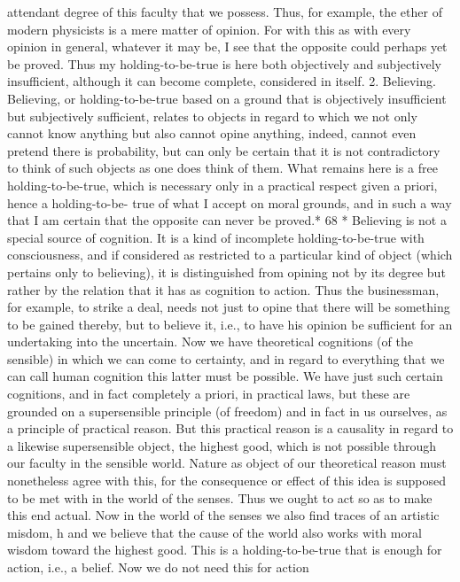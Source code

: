 attendant degree of this faculty that we possess. Thus, for example, the
ether of modern physicists is a mere matter of opinion. For with this as
with every opinion in general, whatever it may be, I see that the opposite
could perhaps yet be proved. Thus my holding-to-be-true is here both
objectively and subjectively insufficient, although it can become complete,
considered in itself.
2. Believing. Believing, or holding-to-be-true based on a ground that is
objectively insufficient but subjectively sufficient, relates to objects in
regard to which we not only cannot know anything but also cannot opine
anything, indeed, cannot even pretend there is probability, but can only be
certain that it is not contradictory to think of such objects as one does
think of them. What remains here is a free holding-to-be-true, which is
necessary only in a practical respect given a priori, hence a holding-to-be-
true of what I accept on moral grounds, and in such a way that I am certain
that the opposite can never be proved.*
68
* Believing is not a special source of cognition. It is a kind of incomplete holding-to-be-true
with consciousness, and if considered as restricted to a particular kind of object (which
pertains only to believing), it is distinguished from opining not by its degree but rather by the
relation that it has as cognition to action. Thus the businessman, for example, to strike a
deal, needs not just to opine that there will be something to be gained thereby, but to believe
it, i.e., to have his opinion be sufficient for an undertaking into the uncertain. Now we have
theoretical cognitions (of the sensible) in which we can come to certainty, and in regard to
everything that we can call human cognition this latter must be possible. We have just such
certain cognitions, and in fact completely a priori, in practical laws, but these are grounded
on a supersensible principle (of freedom) and in fact in us ourselves, as a principle of practical
reason. But this practical reason is a causality in regard to a likewise supersensible object, the
highest good, which is not possible through our faculty in the sensible world. Nature as object
of our theoretical reason must nonetheless agree with this, for the consequence or effect of this
idea is supposed to be met with in the world of the senses. Thus we ought to act so as to
make this end actual.
Now in the world of the senses we also find traces of an artistic misdom, h and we believe
that the cause of the world also works with moral wisdom toward the highest good. This is a
holding-to-be-true that is enough for action, i.e., a belief. Now we do not need this for action
